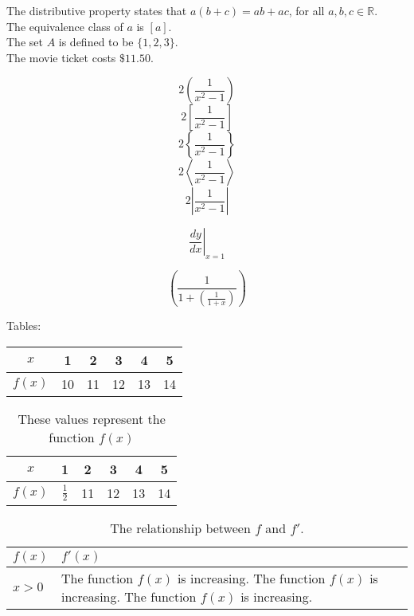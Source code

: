 \documentclass[11pt]{article}
\begin{document}

  The distributive property states that $a(b+c)=ab+ac$, for all $a, b, c \in \mathbb{R}$. \\[6pt]
  The equivalence class of $a$ is $[a]$. \\[6pt]
  The set $A$ is defined to be $\{1, 2, 3\}$. \\[6pt]
  The movie ticket costs $\$11.50$.

  $$2\left(\frac{1}{x^2-{1}}\right)$$
  $$2\left[\frac{1}{x^2-{1}}\right]$$
  $$2\left\{\frac{1}{x^2-{1}}\right\}$$
  $$2\left\langle\frac{1}{x^2-{1}}\right\rangle$$
  $$2\left|\frac{1}{x^2-{1}}\right|$$

  $$\left.\frac{dy}{dx}\right|_{x=1}$$

  $$\left(\frac{1}{1+\left(\frac{1}{1+x}\right)}\right)$$


  Tables: \\


  \begin{tabular}{|c||c|c|c|c|c|}
    \hline
    $x$ & 1 & 2 & 3 & 4 & 5 \\ \hline
    $f(x)$ & 10 & 11 & 12 & 13 & 14 \\ \hline
  \end{tabular}

  \vspace{1cm}

  \begin{table}[H]
    \centering
    \def\arraystretch{1.4}
    \begin{tabular}{|c||c|c|c|c|c|}
      \hline
      $x$ & 1 & 2 & 3 & 4 & 5 \\ \hline
      $f(x)$ & $\frac{1}{2}$ & 11 & 12 & 13 & 14 \\ \hline
    \end{tabular}
    \caption{These values represent the function $f(x)$}
  \end{table}

  \begin{table}[H]
    \centering
    \caption{The relationship between $f$ and $f'$.}
    \def\arraystretch{1.4}
    \begin{tabular}{|l|p{3in}|}
      \hline
      $f(x)$ & $f'(x)$ \\ \hline
      $x>0$ & The function $f(x)$ is increasing. The function $f(x)$ is increasing. 
      The function $f(x)$ is increasing. \\ \hline
    \end{tabular}
  \end{table}
  
\end{document}
